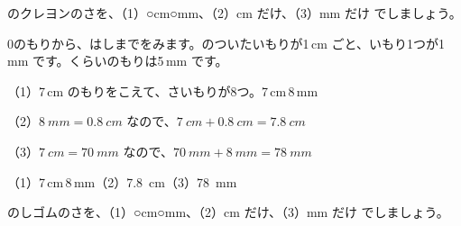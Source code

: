 \begin{reidai}
のクレヨンのさを、（1）○cm○mm、（2）cm だけ、（3）mm だけ でしましょう。\par
\begin{bkcenter}
\end{bkcenter}
\kangaekata 0のもりから、はしまでをみます。のついたいもりが1\,cm ごと、いもり1つが1\,mm です。くらいのもりは5\,mm です。\par
\shiki （1）7\,cm のもりをこえて、さいもりが8つ。7\,cm\,8\,mm\par
\hspace*{2.6\zw}（2）$\qty{8}{mm}=\qty{0.8}{cm}$ なので、$\qty{7}{cm}+\qty{0.8}{cm}=\qty{7.8}{cm}$\par
\hspace*{2.6\zw}（3）$\qty{7}{cm}=\qty{70}{mm}$ なので、$\qty{70}{mm}+\qty{8}{mm}=\qty{78}{mm}$\par
\kotae （1）7\,cm\,8\,mm\quad（2）\qty{7.8}{cm}\quad（3）\qty{78}{mm}
\end{reidai}

\begin{jibun}
のしゴムのさを、（1）○cm○mm、（2）cm だけ、（3）mm だけ でしましょう。\par
\begin{bkcenter}
\end{bkcenter}
\end{jibun}


